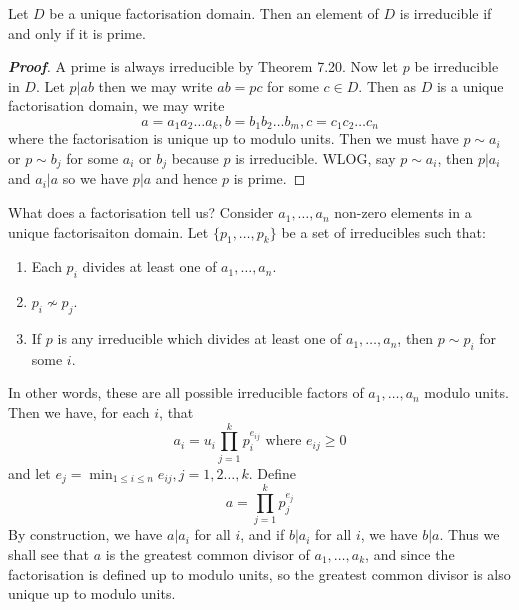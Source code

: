 \begin{theorem} Let $D$ be a unique factorisation domain. Then an element of $D$ is irreducible if and only if it is prime.
\end{theorem}
\begin{proof}[\bf Proof] A prime is always irreducible by Theorem 7.20. Now let $p$ be irreducible in $D$. Let $p|ab$ then we may write $ab=pc$ for some $c \in D$. Then as $D$ is a unique factorisation domain, we may write
$$a=a_1a_2 \ldots a_k,b=b_1b_2\ldots b_m,c=c_1c_2\ldots c_n$$ where the factorisation is unique up to modulo units. Then we must have $p \sim a_i$ or $p \sim b_j$ for some $a_i$ or $b_j$ because $p$ is irreducible. WLOG, say $p \sim a_i$, then $p|a_i$ and $a_i|a$ so we have $p|a$ and hence $p$ is prime.
\end{proof}

What does a factorisation tell us? Consider $a_1,\ldots,a_n$ non-zero elements in a unique factorisaiton domain. Let $\{p_1,\ldots,p_k\}$ be a set of irreducibles such that:
\begin{enumerate}
\item Each $p_i$ divides at least one of $a_1,\ldots,a_n$.
\item $p_i \not \sim p_j$.
\item If $p$ is any irreducible which divides at least one of $a_1,\ldots,a_n$, then $p \sim p_i$ for some $i$.
\end{enumerate}
In other words, these are all possible irreducible factors of $a_1,\ldots,a_n$ modulo units.
Then we have, for each $i$, that
$$a_i=u_i \prod_{j=1}^{k} p_i^{e_{ij}} \text{ where } e_{ij} \ge 0$$
and let $e_j= \min_{1 \le i \le n}e_{ij}, j=1,2\ldots,k$. Define
$$a=\prod_{j=1}^k p_j^{e_j}$$
By construction, we have $a | a_i$ for all $i$, and if $b|a_i$ for all $i$, we have
$b|a$. Thus we shall see that $a$ is the greatest common divisor of $a_1,\ldots,a_k$, and since
the factorisation is defined up to modulo units, so the greatest common divisor is also unique up to
modulo units.

